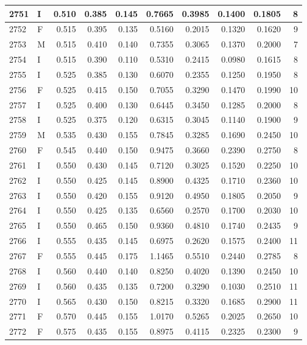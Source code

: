 \documentclass[9pt,twocolumn,twoside,]{pnas-new}
\begin{document}
\begin{tabular}{l|l|r|r|r|r|r|r|r|r}
\hline
2751 & I & 0.510 & 0.385 & 0.145 & 0.7665 & 0.3985 & 0.1400 & 0.1805 & 8\\
\hline
2752 & F & 0.515 & 0.395 & 0.135 & 0.5160 & 0.2015 & 0.1320 & 0.1620 & 9\\
\hline
2753 & M & 0.515 & 0.410 & 0.140 & 0.7355 & 0.3065 & 0.1370 & 0.2000 & 7\\
\hline
2754 & I & 0.515 & 0.390 & 0.110 & 0.5310 & 0.2415 & 0.0980 & 0.1615 & 8\\
\hline
2755 & I & 0.525 & 0.385 & 0.130 & 0.6070 & 0.2355 & 0.1250 & 0.1950 & 8\\
\hline
2756 & F & 0.525 & 0.415 & 0.150 & 0.7055 & 0.3290 & 0.1470 & 0.1990 & 10\\
\hline
2757 & I & 0.525 & 0.400 & 0.130 & 0.6445 & 0.3450 & 0.1285 & 0.2000 & 8\\
\hline
2758 & I & 0.525 & 0.375 & 0.120 & 0.6315 & 0.3045 & 0.1140 & 0.1900 & 9\\
\hline
2759 & M & 0.535 & 0.430 & 0.155 & 0.7845 & 0.3285 & 0.1690 & 0.2450 & 10\\
\hline
2760 & F & 0.545 & 0.440 & 0.150 & 0.9475 & 0.3660 & 0.2390 & 0.2750 & 8\\
\hline
2761 & I & 0.550 & 0.430 & 0.145 & 0.7120 & 0.3025 & 0.1520 & 0.2250 & 10\\
\hline
2762 & I & 0.550 & 0.425 & 0.145 & 0.8900 & 0.4325 & 0.1710 & 0.2360 & 10\\
\hline
2763 & I & 0.550 & 0.420 & 0.155 & 0.9120 & 0.4950 & 0.1805 & 0.2050 & 9\\
\hline
2764 & I & 0.550 & 0.425 & 0.135 & 0.6560 & 0.2570 & 0.1700 & 0.2030 & 10\\
\hline
2765 & I & 0.550 & 0.465 & 0.150 & 0.9360 & 0.4810 & 0.1740 & 0.2435 & 9\\
\hline
2766 & I & 0.555 & 0.435 & 0.145 & 0.6975 & 0.2620 & 0.1575 & 0.2400 & 11\\
\hline
2767 & F & 0.555 & 0.445 & 0.175 & 1.1465 & 0.5510 & 0.2440 & 0.2785 & 8\\
\hline
2768 & I & 0.560 & 0.440 & 0.140 & 0.8250 & 0.4020 & 0.1390 & 0.2450 & 10\\
\hline
2769 & I & 0.560 & 0.435 & 0.135 & 0.7200 & 0.3290 & 0.1030 & 0.2510 & 11\\
\hline
2770 & I & 0.565 & 0.430 & 0.150 & 0.8215 & 0.3320 & 0.1685 & 0.2900 & 11\\
\hline
2771 & F & 0.570 & 0.445 & 0.155 & 1.0170 & 0.5265 & 0.2025 & 0.2650 & 10\\
\hline
2772 & F & 0.575 & 0.435 & 0.155 & 0.8975 & 0.4115 & 0.2325 & 0.2300 & 9\\

\end{tabular}
\end{document}
